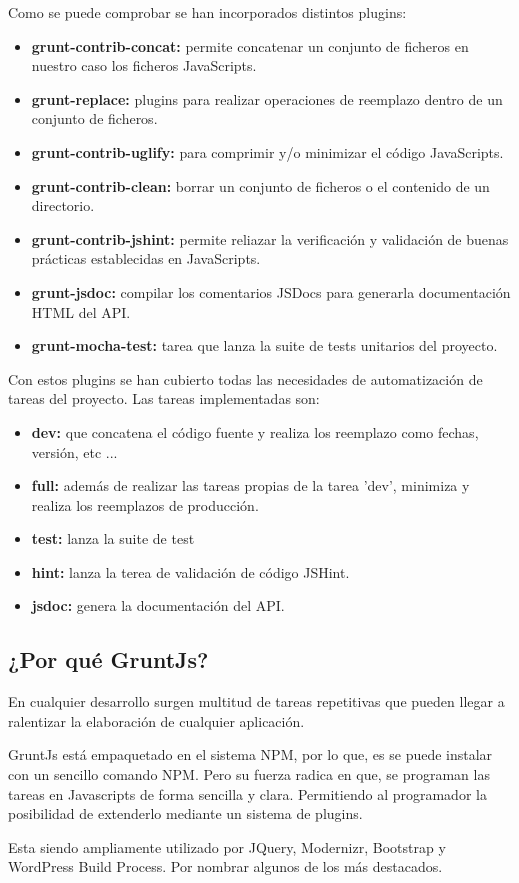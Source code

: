Como se puede comprobar se han incorporados distintos plugins:

\begin{itemize}
\item \textbf{grunt-contrib-concat:} permite concatenar un conjunto de ficheros en nuestro caso los ficheros JavaScripts.
\item \textbf{grunt-replace:} plugins para realizar operaciones de reemplazo dentro de un conjunto de ficheros.
\item \textbf{grunt-contrib-uglify:} para comprimir y/o minimizar el código JavaScripts.
\item \textbf{grunt-contrib-clean:} borrar un conjunto de ficheros o el contenido de un directorio.
\item \textbf{grunt-contrib-jshint:} permite reliazar la verificación y validación de buenas prácticas establecidas en JavaScripts.
\item \textbf{grunt-jsdoc:} compilar los comentarios JSDocs para generarla documentación HTML del API.
\item \textbf{grunt-mocha-test:} tarea que lanza la suite de tests unitarios del proyecto.
\end{itemize}

Con estos plugins se han cubierto todas las necesidades de automatización de tareas del proyecto. Las tareas implementadas son:

\begin{itemize}
\item \textbf{dev:} que concatena el código fuente y realiza los reemplazo como fechas, versión, etc ...
\item \textbf{full:} además de realizar las tareas propias de la tarea 'dev', minimiza y realiza los reemplazos de producción.
\item \textbf{test:} lanza la suite de test
\item \textbf{hint:} lanza la terea de validación de código JSHint.
\item \textbf{jsdoc:} genera la documentación del API.
\end{itemize}

\subsection{¿Por qué GruntJs?}
En cualquier desarrollo surgen multitud de tareas repetitivas que pueden llegar a ralentizar la elaboración de cualquier aplicación. 

GruntJs está empaquetado en el sistema NPM, por lo que, es se puede instalar con un sencillo comando NPM. Pero su fuerza radica en que, se programan las tareas en Javascripts de forma sencilla y clara. Permitiendo al programador la posibilidad de extenderlo mediante un sistema de plugins. 

Esta siendo ampliamente utilizado por JQuery, Modernizr, Bootstrap y WordPress Build Process. Por nombrar algunos de los más destacados.  
